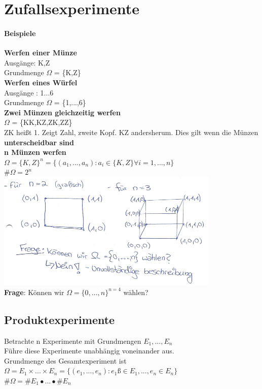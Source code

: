 \chapter{Zufallsexperimente}
\subsubsection{Beispiele}
\textbf{Werfen einer Münze}\\ Ausgänge: K,Z\\
Grundmenge $\Omega$ = \{K,Z\}\medskip\\
\textbf{Werfen eines Würfel}\\
Ausgänge : 1...6\\
Grundmenge $\Omega$ = \{1,...,6\}\medskip\\
\textbf{Zwei Münzen gleichzeitig werfen}\\
$\Omega$ = \{KK,KZ,ZK,ZZ\}\\
ZK heißt 1. Zeigt Zahl, zweite Kopf. KZ andersherum. Dies gilt wenn die Münzen \textbf{unterscheidbar sind}\medskip\\
\textbf{n Münzen werfen}\\
$\Omega = \{K,Z\}^n = \{(a_1,...,a_n):a_i \in \{K,Z\} \forall i = 1,...,n\}$\\
\#$\Omega = 2^n$\\
\includegraphics[width=0.8\textwidth]{img/grafikOmega.PNG}
\medskip\\
\textbf{Frage}: Können wir $\Omega = \{0,...,n\}^{n=4}$ wählen?
\section{Produktexperimente}
Betrachte n Experimente mit Grundmengen $E_1,...,E_n$\\
Führe diese Experimente unabhängig voneinander aus.\medskip\\
Grundmenge des Gesamtexperiment ist \\$\Omega = E_1\times ... \times E_n = \{(e_1,...,e_n):e_1 ß\in E_1,...,e_n\in E_n\}$\\
\#$\Omega = \#E_1 \bullet ... \bullet \#E_n$
